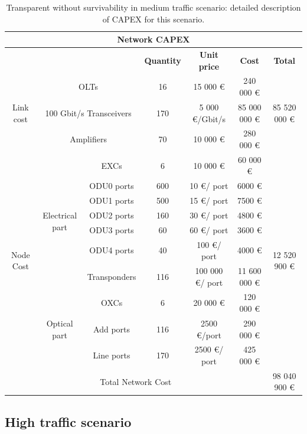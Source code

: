 \begin{table}[H]
	\begin{tabular}{|c|c|c|c|c|c|c|}
		\hline
		\multicolumn{7}{|c|}{\textbf{Network CAPEX}} \\ \hline
		\multicolumn{3}{|c|}{} & \textbf{Quantity} & \textbf{Unit price} & \textbf{Cost} & \textbf{Total} \\ \hline
		\multirow{3}{*}{Link cost} & \multicolumn{2}{c|}{OLTs} & 16 & 15 000 \euro & 240 000 \euro & \multirow{3}{*}{85 520 000 \euro} \\ \cline{2-6}
		& \multicolumn{2}{c|}{100 Gbit/s Transceivers} & 170 & 5 000 \euro/Gbit/s & 85 000 000 \euro &  \\ \cline{2-6}
		& \multicolumn{2}{c|}{Amplifiers} & 70 & 10 000 \euro & 280 000 \euro &  \\ \hline
		\multirow{10}{*}{Node Cost} & \multirow{7}{*}{Electrical part} & EXCs & 6 & 10 000 \euro & 60 000 \euro & \multirow{10}{*}{12 520 900 \euro} \\ \cline{3-6}
		&  & ODU0 ports & 600 & 10 \euro/ port & 6000 \euro &  \\ \cline{3-6}
		&  & ODU1 ports & 500 & 15 \euro/ port & 7500 \euro &  \\ \cline{3-6}
		&  & ODU2 ports & 160 & 30 \euro/ port & 4800 \euro &  \\ \cline{3-6}
		&  & ODU3 ports & 60 & 60 \euro/ port & 3600 \euro &  \\ \cline{3-6}
		&  & ODU4 ports & 40 & 100 \euro/ port & 4000 \euro &  \\ \cline{3-6}
		&  & Transponders & 116 & 100 000 \euro/ port & 11 600 000 \euro &  \\ \cline{2-6}
		& \multirow{3}{*}{Optical part} & OXCs & 6 & 20 000 \euro & 120 000 \euro &  \\ \cline{3-6}
		&  & Add ports & 116 & 2500 \euro/port & 290 000 \euro &  \\ \cline{3-6}
		&  & Line ports & 170 & 2500 \euro/ port & 425 000 \euro &  \\ \hline
		\multicolumn{6}{|c|}{Total Network Cost} & 98 040 900 \euro \\ \hline
	\end{tabular}
	\caption{Transparent without survivability in medium traffic scenario: detailed description of CAPEX for this scenario.}
\end{table}

\subsection{High traffic scenario}

